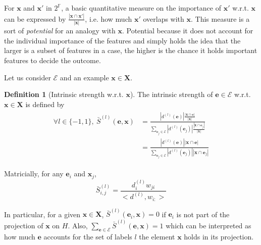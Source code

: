 \documentclass[preprint,12pt]{elsarticle}
\theoremstyle{definition}
\newtheorem{definition}{Definition}[section]
\begin{document}
For $\mathbf x$ and $\mathbf x'$ in $2^{\mathbb F}$, a basic quantitative measure on the importance of $\mathbf x'$ w.r.t. $\mathbf x$ can be expressed by $\frac{|\mathbf x \cap \mathbf x'|}{|\mathbf x|}$, i.e. how much $\mathbf x'$ overlaps with $\mathbf x$. This measure is a sort of {\it potential} for an analogy with $\mathbf  x$. Potential because it does not account for the individual importance of the features and simply holds the idea that the larger is a subset of features in a case, the higher is the chance it holds important features to decide the outcome.

Let us consider $\mathcal E$ and an example $\mathbf x \in \mathbf X$.
\begin{definition}[Intrinsic strength w.r.t. $\mathbf x$]
  The intrinsic strength of $\mathbf e \in \mathcal E$ w.r.t. $\mathbf x \in \mathbf X$ is defined by \begin{align}
    \begin{split}
    \forall l \in \{ -1, 1\}, ~ \bar S^{(l)}(\mathbf e, \mathbf x) & = \frac{|d^{(l)}(\mathbf e)| \frac{|\mathbf x \cap \mathbf e|}{|\mathbf x|}}{\underset{\mathbf e_j \in \mathcal E}{\sum}|d^{(l)}(\mathbf e_j)|  \frac{|\mathbf x \cap \mathbf e_j|}{|\mathbf x|}} \\
    & = \frac{|d^{(l)}(\mathbf e)|  |\mathbf x \cap \mathbf e|}{\underset{\mathbf e_j \in \mathcal E}{\sum}|d^{(l)}(\mathbf e_j)| |\mathbf x \cap \mathbf e_j|}
    \end{split}
    \end{align}

  Matricially, for any $\mathbf e_i$ and $\mathbf x_j$,
  \begin{equation}
   \bar S^{(l)}_{i,j} = \frac{d^{(l)}_i w_{ji}}{<d^{(l)}, w_{i:}>}
  \end{equation}
\end{definition}
\noindent
In particular, for a given $\mathbf x \in \mathbf X$, $\bar S^{(l)}(\mathbf e_i, \mathbf x) =0$ if $\mathbf e_i$ is not part of the projection of $\mathbf x$ on $H$. Also, $\underset{\mathbf e \in \mathcal E}{\sum} \bar S^{(l)}(\mathbf e, \mathbf x) = 1$ which can be interpreted as how much $\mathbf e$ accounts for the set of labels $l$ the element $\mathbf x$ holds in its projection.
\end{document}
